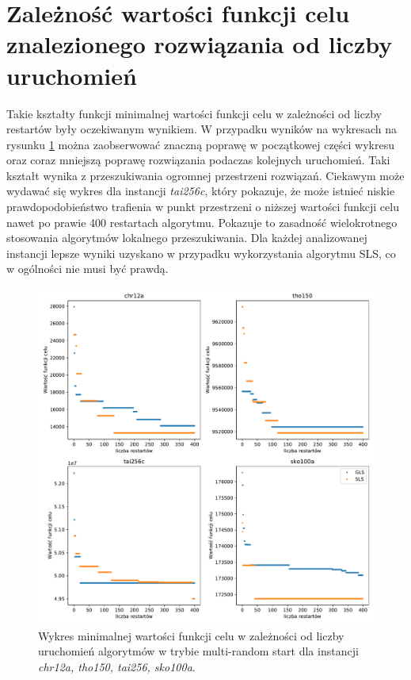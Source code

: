 \documentclass{article}
\begin{document}
\section{Zależność wartości funkcji celu znalezionego rozwiązania od liczby uruchomień }
Takie kształty funkcji minimalnej wartości funkcji celu w zależności od liczby restartów były oczekiwanym wynikiem. W przypadku wyników na wykresach na rysunku \ref{fig:quality_min} można zaobserwować znaczną poprawę w początkowej części wykresu oraz coraz mniejszą poprawę rozwiązania podaczas kolejnych uruchomień. Taki kształt wynika z przeszukiwania ogromnej przestrzeni rozwiązań. Ciekawym może wydawać się wykres dla instancji \textit{tai256c}, który pokazuje, że może istnieć niskie prawdopodobieństwo trafienia w punkt przestrzeni o niższej wartości funkcji celu nawet po prawie 400 restartach algorytmu. Pokazuje to zasadność wielokrotnego stosowania algorytmów lokalnego przeszukiwania. Dla każdej analizowanej instancji lepsze wyniki uzyskano w przypadku wykorzystania algorytmu SLS, co w ogólności nie musi być prawdą.
\begin{figure}[H]
	\centering
	\includegraphics[width=\linewidth]{figs/min_acc_end_obj_val.pdf}
	\caption{Wykres minimalnej wartości funkcji celu w zależności od liczby uruchomień algorytmów w trybie multi-random start dla instancji \textit{chr12a, tho150, tai256, sko100a}.}
	\label{fig:quality_min}
\end{figure}
\end{document}
